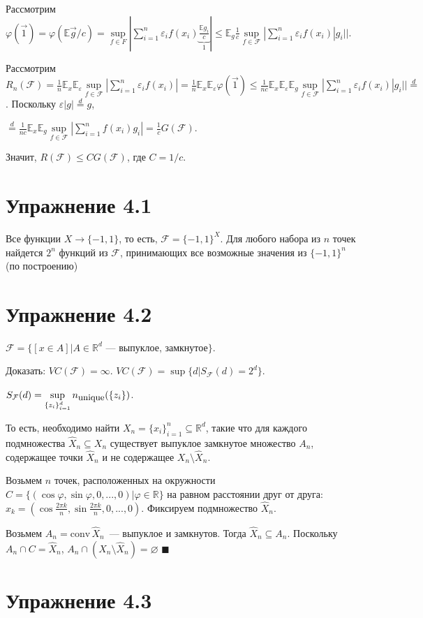 \documentclass[a4paper]{article}
\newcommand{\F}{\mathcal{F}}
\newcommand{\R}{\mathbb{R}}
\newcommand{\conv}{\mbox{conv}\,}
\newcommand{\E}{\mathbb{E}}
\def\eps{\varepsilon}
\begin{document}
Рассмотрим $\varphi(\vec{1})=\varphi(\E\vec{g}/c)=\sup\limits_{f\in F}|\sum\limits_{i=1}^n \eps_i f(x_i) \underbrace{\frac{\E g_i}{c}}_1|\leqslant \E_{g}\frac{1}{c}\sup\limits_{f\in \F}|\sum\limits_{i=1}^n \eps_if(x_i)|g_i||$.

Рассмотрим $R_n(\F)=\frac{1}{n}\E_x\E_\eps\sup\limits_{f\in\F}|\sum\limits_{i=1}^n \eps_if(x_i)|=\frac{1}{n}\E_x\E_\eps \varphi(\vec{1})\leqslant \frac{1}{nc}\E_x\E_\eps\E_g \sup\limits_{f\in \F}|\sum\limits_{i=1}^n \eps_if(x_i)|g_i||\overset{d}{=}$. Поскольку $\eps |g|\overset{d}{=}g$,

$\overset{d}{=}\frac{1}{nc}\E_x\E_g\sup\limits_{f\in \F}|\sum\limits_{i=1}^n f(x_i)g_i|=\frac{1}{c}G(\F)$.

Значит, $R(\F)\leqslant CG(\F)$, где $C=1/c$.
\section*{Упражнение 4.1}
Все функции $X\to \{-1,1\}$, то есть, $\F=\{-1,1\}^X$. Для любого набора из $n$ точек найдется $2^n$ функций из $\F$, принимающих все возможные значения из $\{-1,1\}^n$ (по построению)
\section*{Упражнение 4.2}
$\F=\{[x\in A]\big| A\in\R^d \mbox{~--- выпуклое, замкнутое}\}$.

Доказать: $VC(\F)=\infty$. $VC(\F)=\sup\{d\big| S_\F (d)=2^d\}$.

$S_\F (d)=\sup\limits_{\{z_i\}_{i=1}^d} n_{\mbox{\small unique}}(\{z_i\})$.

То есть, необходимо найти $X_n=\{x_i\}_{i=1}^n\subseteq \R^d$, такие что для каждого подмножества $\hat{X}_n\subseteq X_n$ существует выпуклое замкнутое множество $A_n$, содержащее точки $\hat{X}_n$ и не содержащее $X_n\setminus \hat{X}_n$.

Возьмем $n$ точек, расположенных на окружности $C=\{(\cos\varphi,\sin\varphi, 0,...,0)\big| \varphi\in\R\}$ на равном расстоянии друг от друга: $x_k=(\cos \frac{2\pi k}{n},\sin \frac{2\pi k}{n},0,...,0)$. Фиксируем подмножество $\hat{X}_n$.

Возьмем $A_n=\conv\hat{X}_n$~--- выпуклое и замкнутов. Тогда $\hat{X}_n\subseteq A_n$. Поскольку $A_n\cap C=\hat{X}_n$, $A_n\cap (X_n\setminus \hat{X}_n)=\varnothing$ $\blacksquare$
\section*{Упражнение 4.3}
\end{document}
